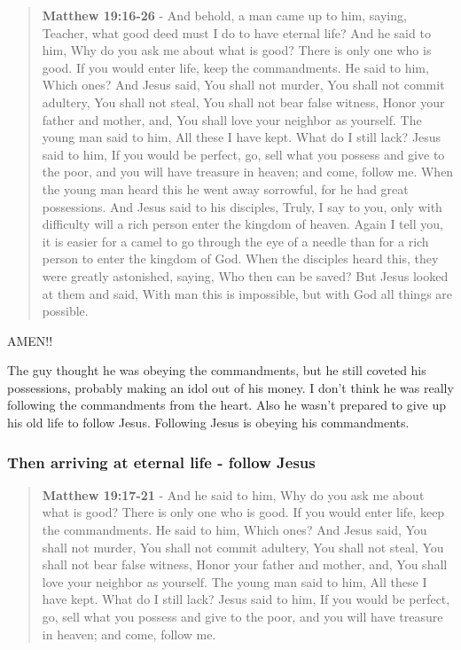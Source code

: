 \documentclass[11pt]{article}
\begin{document}
\begin{quote}
\textbf{Matthew 19:16-26} - And behold, a man came up to him, saying, Teacher, what good deed must I do to have eternal life? And he said to him, Why do you ask me about what is good? There is only one who is good. If you would enter life, keep the commandments. He said to him, Which ones? And Jesus said, You shall not murder, You shall not commit adultery, You shall not steal, You shall not bear false witness, Honor your father and mother, and, You shall love your neighbor as yourself. The young man said to him, All these I have kept. What do I still lack? Jesus said to him, If you would be perfect, go, sell what you possess and give to the poor, and you will have treasure in heaven; and come, follow me. When the young man heard this he went away sorrowful, for he had great possessions. And Jesus said to his disciples, Truly, I say to you, only with difficulty will a rich person enter the kingdom of heaven. Again I tell you, it is easier for a camel to go through the eye of a needle than for a rich person to enter the kingdom of God. When the disciples heard this, they were greatly astonished, saying, Who then can be saved? But Jesus looked at them and said, With man this is impossible, but with God all things are possible.
\end{quote}

AMEN!!

The guy thought he was obeying the commandments, but he still coveted his possessions, probably making an idol out of his money.
I don't think he was really following the commandments from the heart.
Also he wasn't prepared to give up his old life to follow Jesus.
Following Jesus is obeying his commandments.

\subsubsection{Then arriving at eternal life - follow Jesus}
\label{sec:org085de94}
\begin{quote}
\textbf{Matthew 19:17-21} - And he said to him, Why do you ask me about what is good? There is only one who is good. If you would enter life, keep the commandments. He said to him, Which ones? And Jesus said, You shall not murder, You shall not commit adultery, You shall not steal, You shall not bear false witness, Honor your father and mother, and, You shall love your neighbor as yourself. The young man said to him, All these I have kept. What do I still lack? Jesus said to him, If you would be perfect, go, sell what you possess and give to the poor, and you will have treasure in heaven; and come, follow me.
\end{quote}
\end{document}
